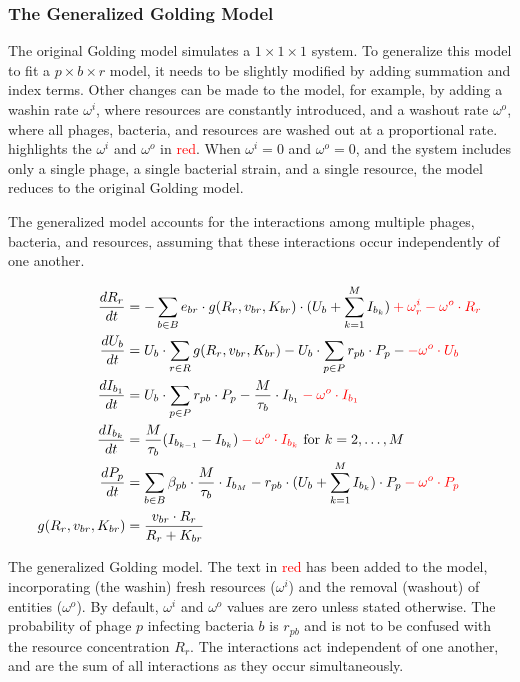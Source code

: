 \subsubsection{The Generalized Golding Model}
\label{sec:adapted_golding_model}
The original Golding model simulates a $1\times 1 \times 1$ system. 
To generalize this model to fit a $p \times b \times r$ model, it needs to be slightly modified by adding summation and index terms. 
Other changes can be made to the model, for example, by adding a washin rate $\omega^{i}$, where resources are constantly introduced, and a washout rate $\omega^{o}$, where all phages, bacteria, and resources are washed out at a proportional rate. 
 highlights the $\omega^i$ and $\omega^o$ in \textcolor{red}{red}. 
When $\omega^i=0$ and $\omega^o=0$, and the system includes only a single phage, a single bacterial strain, and a single resource, the model reduces to the original Golding model.

The generalized model accounts for the interactions among multiple phages, bacteria, and resources, assuming that these interactions occur independently of one another. 

\begin{eqfloat}
    \begin{align}
        \frac{dR_r}{dt} &= -\sum_{b \in B} e_{b r} \cdot g(R_r, v_{b r}, K_{b r})\cdot (U_b + \sum_{k=1}^{M} I_{b_k}) \mathcolor{red}{+ \omega^i_r -\omega^o \cdot R_r}\\
        \frac{dU_b}{dt} &= U_b \cdot \sum_{r \in R} g(R_r, v_{b r}, K_{b r}) - U_b \cdot \sum_{p \in P} r_{p b} \cdot P_p -\mathcolor{red}{-\omega^o \cdot U_b}\\
        \frac{dI_{b_1}}{dt} &= U_b \cdot \sum_{p \in P}r_{p b} \cdot P_p - \frac{M}{\tau_b}\cdot I_{b_1} \mathcolor{red}{-\omega^o \cdot I_{b_1}}\\
        \frac{dI_{b_k}}{dt} &= \frac{M}{\tau_b}(I_{b_{k-1}}-I_{b_k}) \mathcolor{red}{-\omega^o \cdot I_{b_k}}\text{ for } k=2, \dots, M \\
        \frac{dP_p}{dt} &= \sum_{b\in B}\beta_{p b}\cdot\frac{M}{\tau_b} \cdot I_{b_M} - r_{p b}\cdot(U_b + \sum_{k=1}^{M} I_{b_k})\cdot P_p \mathcolor{red}{-\omega^o \cdot P_p}\\
        g(R_r, v_{b r}, K_{b r}) &= \frac{v_{b r} \cdot R_r}{R_r + K_{b r}}
        \label{eq:adapted_golding_model}
    \end{align} 
    \caption{
        The generalized Golding model. 
        The text in \textcolor{red}{red} has been added to the model, incorporating (the washin) fresh resources ($\omega^i$) and the removal (washout) of entities ($\omega^o$). 
        By default, $\omega^i$ and $\omega^o$ values are zero unless stated otherwise.
        The probability of phage $p$ infecting bacteria $b$ is $r_{pb}$ and is not to be confused with the resource concentration $R_r$. 
        The interactions act independent of one another, and are the sum of all interactions as they occur simultaneously. 
    }
\end{eqfloat}

